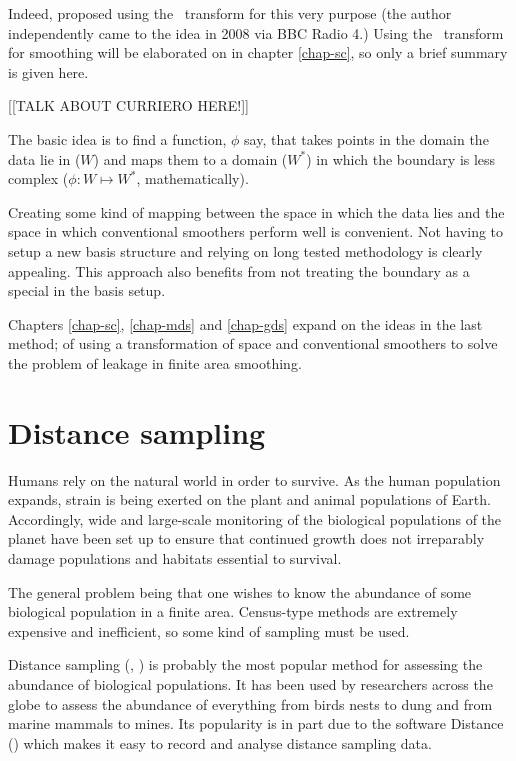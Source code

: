 \begin{enumerate}
Indeed, \cite{eilerstalk} proposed using the \sch\ transform for this very purpose (the author independently came to the idea in 2008 via BBC Radio 4.) Using the \sch\ transform for smoothing will be elaborated on in chapter \ref{chap-sc}, so only a brief summary is given here.

[[TALK ABOUT CURRIERO HERE!]]

The basic idea is to find a function, $\phi$ say, that takes points in the domain the data lie in ($W$) and maps them to a domain ($W^*$) in which the boundary is less complex ($\phi : W \mapsto W^*$, mathematically).

Creating some kind of mapping between the space in which the data lies and the space in which conventional smoothers perform well is convenient. Not having to setup a new basis structure and relying on long tested methodology is clearly appealing. This approach also benefits from not treating the boundary as a special in the basis setup.
\end{enumerate}

Chapters \ref{chap-sc}, \ref{chap-mds} and \ref{chap-gds} expand on the ideas in the last method; of using a transformation of space and conventional smoothers to solve the problem of leakage in finite area smoothing.




\section{Distance sampling}

Humans rely on the natural world in order to survive. As the human population expands, strain is being exerted on the plant and animal populations of Earth. Accordingly, wide and large-scale monitoring of the biological populations of the planet have been set up to ensure that continued growth does not irreparably damage populations and habitats essential to survival.

The general problem being that one wishes to know the abundance of some biological population in a finite area. Census-type methods are extremely expensive and inefficient, so some kind of sampling must be used. 

Distance sampling (\cite{IDS}, \cite{ADS}) is probably the most popular method for assessing the abundance of biological populations. It has been used by researchers across the globe to assess the abundance of everything from birds nests to dung and from marine mammals to mines. Its popularity is in part due to the software Distance (\cite{distance-software}) which makes it easy to record and analyse distance sampling data.

